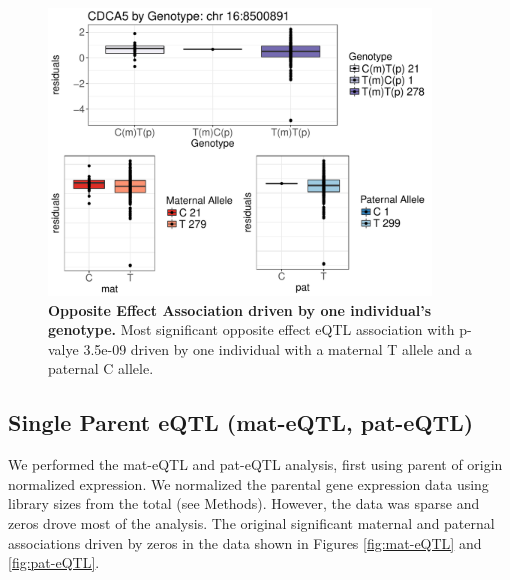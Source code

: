 \begin{figure}[!htb]
\centering \includegraphics[width=4in]{img/ch04/fig-03-oeQTL.pdf}
\caption[Opposite Effect Association driven by one individual's genotype.]{\textbf{Opposite Effect Association driven by one individual's genotype.} Most significant opposite effect eQTL association with p-valye 3.5e-09 driven by one individual with a maternal T allele and a paternal C allele.}
\label{fig:oeQTL3}
\end{figure}



\subsection{Single Parent eQTL (mat-eQTL, pat-eQTL)}\label{Single Parent eQTL (mat-eQTL, pat-eQTL)} 
We performed the mat-eQTL and pat-eQTL analysis, first using parent of origin normalized expression. We normalized the parental gene expression data using library sizes from the total (see Methods). However, the data was sparse and zeros drove most of the analysis. The original significant maternal and paternal associations driven by zeros in the data shown in Figures \ref{fig:mat-eQTL} and \ref{fig:pat-eQTL}. 

